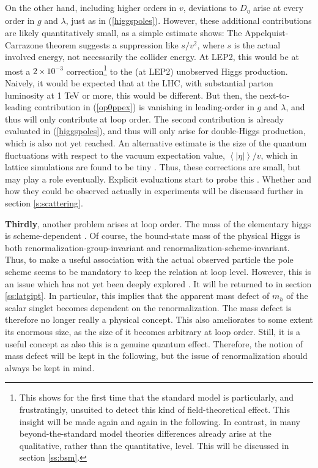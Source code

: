 \documentclass[final,12pt]{article}
\newcommand*{\pref}[1]{(\ref{#1})}
\newcommand*{\1}{1\!\!\!\bot}
\newcommand*{\la}{\left\langle}
\newcommand*{\ra}{\right\rangle}
\begin{document}
On the other hand, including higher orders in $v$, deviations to $D_\eta$ arise at every order in $g$ and $\lambda$, just as in \pref{higgspoles}. However, these additional contributions are likely quantitatively small, as a simple estimate shows: The Appelquist-Carrazone theorem suggests a suppression like $s/v^2$, where $s$ is the actual involved energy, not necessarily the collider energy. At LEP2, this would be at most a $2\times 10^{-3}$ correction\footnote{This shows for the first time that the standard model is particularly, and frustratingly, unsuited to detect this kind of field-theoretical effect. This insight will be made again and again in the following. In contrast, in many beyond-the-standard model theories differences already arise at the qualitative, rather than the quantitative, level. This will be discussed in section \ref{ss:bsm}.} to the (at LEP2) unobserved Higgs production. Naively, it would be expected that at the LHC, with substantial parton luminosity at 1 TeV or more, this would be different. But then, the next-to-leading contribution in \pref{op0ppex} is vanishing in leading-order in $g$ and $\lambda$, and thus will only contribute at loop order. The second contribution is already evaluated in \pref{higgspoles}, and thus will only arise for double-Higgs production, which is also not yet reached. An alternative estimate is the size of the quantum fluctuations with respect to the vacuum expectation value, $\la|\eta|\ra/v$, which in lattice simulations are found to be tiny \cite{Maas:2012ct}. Thus, these corrections are small, but may play a role eventually. Explicit evaluations start to probe this \cite{Maas:unpublished,Raubitzek:unpublished}. Whether and how they could be observed actually in experiments will be discussed further in section \ref{s:scattering}.

{\bf Thirdly}, another problem arises at loop order. The mass of the elementary higgs is scheme-dependent \cite{Bohm:2001yx,Einhorn:1992um}. Of course, the bound-state mass of the physical Higgs is both renormalization-group-invariant and renormalization-scheme-invariant. Thus, to make a useful association with the actual observed particle the pole scheme \cite{Bohm:2001yx,Einhorn:1992um} seems to be mandatory to keep the relation at loop level. However, this is an issue which has not yet been deeply explored \cite{Maas:2013aia}. It will be returned to in section \ref{ss:latgipt}. In particular, this implies that the apparent mass defect of $m_h$ of the scalar singlet becomes dependent on the renormalization. The mass defect is therefore no longer really a physical concept. This also ameliorates to some extent its enormous size, as the size of it becomes arbitrary at loop order. Still, it is a useful concept as also this is a genuine quantum effect. Therefore, the notion of mass defect will be kept in the following, but the issue of renormalization should always be kept in mind.
\end{document}
